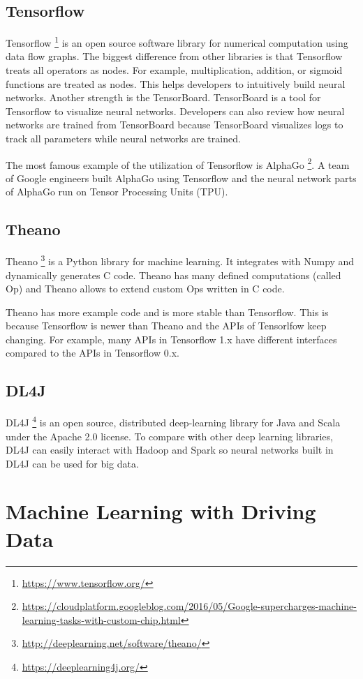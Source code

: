 \documentclass[draft,dvipsnames]{drexel-thesis}
\begin{document}
\begin{thesis}
\subsection{Tensorflow}
Tensorflow \footnote{\url{https://www.tensorflow.org/}} is an open source software library for numerical computation using data flow graphs. The biggest difference from other libraries is that Tensorflow treats all operators as nodes. For example, multiplication, addition, or sigmoid functions are treated as nodes.  This helps developers to intuitively build neural networks. Another strength is the TensorBoard. TensorBoard is a tool for Tensorflow to visualize neural networks. Developers can also review how neural networks are trained from TensorBoard because TensorBoard visualizes logs to track all parameters while neural networks are trained.

The most famous example of the utilization of Tensorflow is AlphaGo \footnote{\url{https://cloudplatform.googleblog.com/2016/05/Google-supercharges-machine-learning-tasks-with-custom-chip.html}}. A team of Google engineers built AlphaGo using Tensorflow and the neural network parts of AlphaGo run on Tensor Processing Units (TPU).


\subsection{Theano}
Theano \footnote{\url{http://deeplearning.net/software/theano/}} is a Python library for machine learning. It integrates with Numpy and dynamically generates C code. Theano has many defined computations (called Op) and Theano allows to extend custom Ops written in C code.

Theano has more example code and is more stable than Tensorflow. This is because Tensorflow is newer than Theano and  the APIs of Tensorlfow keep changing. For example, many APIs in Tensorflow 1.x have different interfaces compared to  the APIs in Tensorflow 0.x.


\subsection{DL4J}
DL4J \footnote{\url{https://deeplearning4j.org/}} is an open source, distributed deep-learning library for Java and Scala under the Apache 2.0 license. To compare with other deep learning libraries, DL4J can easily interact with Hadoop and Spark so neural networks built in DL4J can be used for big data.


\section{Machine Learning with Driving Data}\label{sec:MLDD}


\end{thesis}
\end{document}
